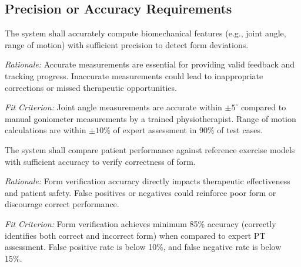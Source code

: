 \documentclass[12pt]{article}
\newcommand{\rationale}[1]{\par\emph{Rationale:} #1}
\newcommand{\fitcrit}[1]{\par\emph{Fit Criterion:} #1}
\begin{document}
\subsection{Precision or Accuracy Requirements}
\begin{reqlist}
	\item[PR-PAR 1.] The system shall accurately compute biomechanical features (e.g., joint angle, range of motion) with sufficient precision to detect form deviations.
	\rationale{Accurate measurements are essential for providing valid feedback and tracking progress. Inaccurate measurements could lead to inappropriate corrections or missed therapeutic opportunities.}
	\fitcrit{Joint angle measurements are accurate within $\pm5^\circ$ compared to manual goniometer measurements by a trained physiotherapist. Range of motion calculations are within $\pm10\%$ of expert assessment in 90\% of test cases.}
	
	\item[PR-PAR 2.] The system shall compare patient performance against reference exercise models with sufficient accuracy to verify correctness of form.
	\rationale{Form verification accuracy directly impacts therapeutic effectiveness and patient safety. False positives or negatives could reinforce poor form or discourage correct performance.}
	\fitcrit{Form verification achieves minimum 85\% accuracy (correctly identifies both correct and incorrect form) when compared to expert PT assessment. False positive rate is below 10\%, and false negative rate is below 15\%.}
\end{reqlist}
\end{document}
